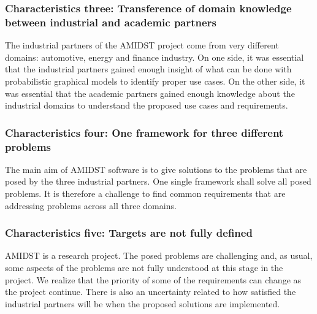\documentclass[11pt, oneside]{article}   	%
\begin{document}
\subsubsection*{Characteristics three: Transference of domain knowledge between industrial and academic partners}
\label{sec:characteristic3}

The industrial partners of the AMIDST project come from very different domains: automotive, energy and finance industry.  On one side, it was essential that the industrial partners gained enough insight of what can be done with probabilistic graphical models to identify proper use cases.  On the other side, it was essential that the academic partners gained enough knowledge about the industrial domains to understand the proposed use cases and requirements.

\subsubsection*{Characteristics four:  One framework for three different problems}
\label{sec:characteristic4}

The main aim of AMIDST software is to give solutions to the problems that are posed by the three industrial partners.  One single framework shall solve all posed problems.  It is therefore a challenge to find common requirements that are addressing problems across all three domains.

\subsubsection*{Characteristics five: Targets are not fully defined}
\label{sec:characteristic5}

AMIDST is a research project. The posed problems are challenging and, as usual, some aspects of the problems are not fully understood at this stage in the project. We realize that the priority of some of the requirements can change as the project continue. There is also an uncertainty related to how satisfied the industrial partners will be when the proposed solutions are implemented.  

\end{document}
